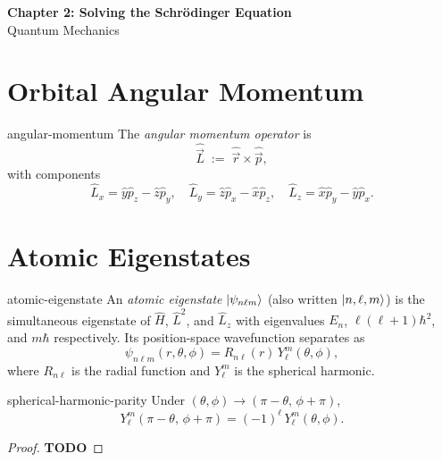\documentclass[12pt]{article}
\begin{document}
\begin{center}
  {\LARGE\bfseries Chapter 2: Solving the Schr\"odinger Equation}\\[0.25em]
  {\large Quantum Mechanics}\\[0.15em]
\end{center}


\section{Orbital Angular Momentum}

\begin{dfn}{angular-momentum}
  The \emph{angular momentum operator} is
  \[
    \hat{\vec{L}} \;:=\; \hat{\vec{r}} \times \hat{\vec{p}},
  \]
  with components
  \[
    \hat{L}_x = \hat{y}\hat{p}_z - \hat{z}\hat{p}_y, \quad
    \hat{L}_y = \hat{z}\hat{p}_x - \hat{x}\hat{p}_z, \quad
    \hat{L}_z = \hat{x}\hat{p}_y - \hat{y}\hat{p}_x.
  \]
\end{dfn}

\section{Atomic Eigenstates}

\begin{dfn}{atomic-eigenstate}
  An \emph{atomic eigenstate} $\ket{\psi_{n\ell m}}$ (also written $\ket{n,\ell,m}$) is the simultaneous eigenstate of $\hat{H}$, $\hat{L}^2$, and $\hat{L}_z$ with eigenvalues $E_n$, $\ell(\ell+1)\hbar^2$, and $m\hbar$ respectively. Its position-space wavefunction separates as
  \[
    \psi_{n\ell m}(r, \theta, \phi) = R_{n\ell}(r)\, Y_\ell^m(\theta, \phi),
  \]
  where $R_{n\ell}$ is the radial function and $Y_\ell^m$ is the spherical harmonic.
\end{dfn}

\begin{thm}{spherical-harmonic-parity}
  Under $(\theta, \phi) \to (\pi - \theta,\, \phi + \pi)$,
  \[
    Y_\ell^m(\pi - \theta,\, \phi + \pi) = (-1)^\ell\, Y_\ell^m(\theta, \phi).
  \]
\end{thm}

\begin{proof}
  {\color{blue}\textbf{TODO}}
\end{proof}
\end{document}
